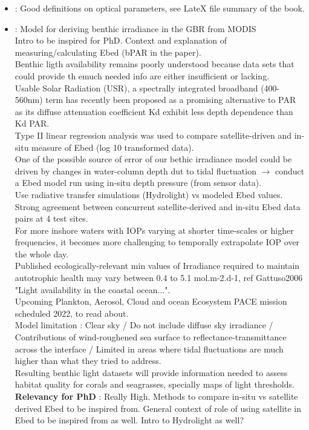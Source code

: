 \documentclass[]{report}
\begin{document}
\begin{itemize}
		\item \cite{kirk1994} : Good definitions on optical parameters, see LateX file summary of the book.
		\item \cite{magno2019model} : Model for deriving benthic irradiance in the GBR from MODIS
		\\ Intro to be inspired for PhD. Context and explanation of measuring/calculating Ebed (bPAR in the paper).
		\\ Benthic ligth availability remains poorly understood because data sets that could provide th emuch needed info are either insufficient or lacking.
		\\ Usable Solar Radiation (USR), a spectrally integrated broadband (400-560nm) term has recently been proposed as a promising alternative to PAR as its diffuse attenuation coefficient Kd exhibit less depth dependence than Kd PAR.
		\\Type II linear regression analysis was used to compare satellite-driven and in-situ measure of Ebed (log 10 transformed data).
		\\ One of the possible source of error of our bethic irradiance model could be driven by changes in water-column depth dut to tidal fluctuation $\rightarrow$ conduct a Ebed model run using in-situ depth pressure (from sensor data).
		\\Use radiative transfer simulations (Hydrolight) vs modeled Ebed values. Strong agreement between concurrent satellite-derived and in-situ Ebed data pairs at 4 test sites.
		\\ For more inshore waters with IOPs varying at shorter time-scales or higher frequencies, it becomes more challenging to temporally extrapolate IOP over the whole day.
		\\Published ecologically-relevant min values of Irradiance required to maintain autotrophic health may vary between 0.4 to 5.1  mol.m-2.d-1, ref Gattuso2006 "Light availability in the coastal ocean...".
		\\ Upcoming Plankton, Aerosol, Cloud and ocean Ecosystem PACE mission scheduled 2022, to read about.
		\\Model limitation : Clear sky / Do not include diffuse sky irradiance / Contributions of wind-roughened sea surface to reflectance-transmittance across the interface / Limited in areas where tidal fluctuations are much higher than what they tried to address.
		\\ Resulting benthic light datasets will provide information needed to assess habitat quality for corals and seagrasses, specially maps of light thresholds.
		\\\textbf{Relevancy for PhD} : Really High. Methods to compare in-situ vs satellite derived Ebed to be inspired from. General context of role of using satellite in Ebed to be inspired from as well. Intro to Hydrolight as well?
	\end{itemize}
\end{document}
